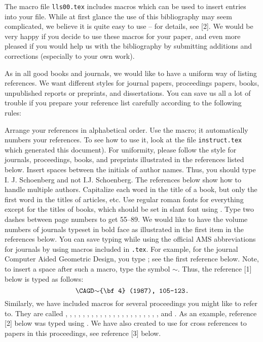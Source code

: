 The macro file {\tt lls00.tex} includes macros which
can be used to insert entries into your \Tex file. While
at first glance the use of this bibliography may seem complicated,
we believe it is quite easy to use -- for details, see [2].
We would be very happy if you decide to use these macros
for your paper, and even more pleased if you would help us
with the bibliography by submitting additions and
corrections (especially to your own work).

As in all good books and journals,
we would like to have a uniform way of listing references.
We want different styles for journal papers, proceedings papers,
books, unpublished reports or preprints, and dissertations.
You can save us all a lot of trouble if you prepare your
reference list carefully according to the following rules:
\ms

\bull  Arrange your references in alphabetical order.
\sm
\bull  Use the  macro; it
automatically numbers your references.
To see how to use it,
look at the file {\tt instruct.tex} which generated this document).
\sm
\bull  For uniformity, please follow the style for journals,
proceedings, books, and preprints illustrated in the references
listed below.
\sm
\bull  Insert spaces between the initials of author
names.	 Thus, you should type I. J. Schoenberg and not I.J. Schoenberg.
\sm
\bull The references below show how to handle multiple
authors.
\sm
\bull  Capitalize each word in the title of a book, but
only the first word in the titles of articles, etc.
\sm
\bull Use regular roman fonts for everything except for
the titles of books, which should be set in slant font using .
\sm
\bull Type two dashes between page numbers to get 55--89.
\sm
\bull We would like to have the volume numbers of journals typeset
 in bold face as illustrated in the first item in the references below.
\sm
\bull  You can save typing while using the official AMS
abbreviations for journals by using macros included in
{\tt \macname.tex}.	For example, for the journal Computer Aided
Geometric Design, you type ; see the first reference
below.	Note, to insert a space after such a macro, type
the symbol $\sim$.  Thus, the reference [1] below is typed as
follows:
$$ \hbox{\tt \back CAGD$\sim$\lb\back bf 4\rb~(1987), 105--123.} $$
\sm
\bull Similarly, we have included macros for several proceedings
you might like to refer to. They are called  
, , ,
, , ,
, , 
, ,
, , , , ,
, , , ,
, , , and .
As an example, reference [2] below was typed using .
We have also created
 to use for cross references to
papers in this proceedings, see reference [3] below.
\ms

